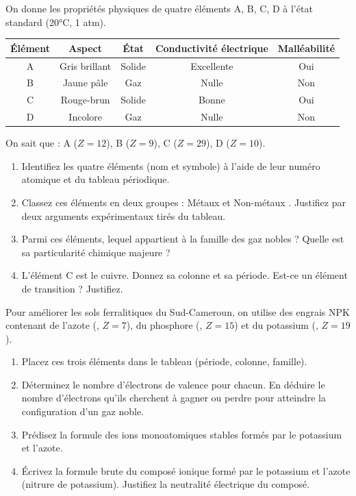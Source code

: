 \documentclass[11pt]{article}
\begin{document}
\begin{exercice}
On donne les propriétés physiques de quatre éléments A, B, C, D à l'état standard (20°C, 1 atm).

\begin{center}
\begin{tabular}{|c|c|c|c|c|}
\hline
\textbf{Élément} & \textbf{Aspect} & \textbf{État} & \textbf{Conductivité électrique} & \textbf{Malléabilité} \\ \hline
A & Gris brillant & Solide & Excellente & Oui \\ \hline
B & Jaune pâle & Gaz & Nulle & Non \\ \hline
C & Rouge-brun & Solide & Bonne & Oui \\ \hline
D & Incolore & Gaz & Nulle & Non \\ \hline
\end{tabular}
\end{center}
On sait que : A ($Z=12$), B ($Z=9$), C ($Z=29$), D ($Z=10$).
\begin{enumerate}
    \item Identifiez les quatre éléments (nom et symbole) à l'aide de leur numéro atomique et du tableau périodique.
    \item Classez ces éléments en deux groupes : \og Métaux \fg et \og Non-métaux \fg. Justifiez par deux arguments expérimentaux tirés du tableau.
    \item Parmi ces éléments, lequel appartient à la famille des gaz nobles ? Quelle est sa particularité chimique majeure ?
    \item L'élément C est le cuivre. Donnez sa colonne et sa période. Est-ce un élément de transition ? Justifiez.
\end{enumerate}
\end{exercice}

\begin{exercice}
Pour améliorer les sols ferralitiques du Sud-Cameroun, on utilise des engrais NPK contenant de l'azote (, $Z=7$), du phosphore (, $Z=15$) et du potassium (, $Z=19$).
\begin{enumerate}
    \item Placez ces trois éléments dans le tableau (période, colonne, famille).
    \item Déterminez le nombre d'électrons de valence pour chacun. En déduire le nombre d'électrons qu'ils cherchent à gagner ou perdre pour atteindre la configuration d'un gaz noble.
    \item Prédisez la formule des ions monoatomiques stables formés par le potassium et l'azote.
    \item Écrivez la formule brute du composé ionique formé par le potassium et l'azote (nitrure de potassium). Justifiez la neutralité électrique du composé.
\end{enumerate}
\end{exercice}
\end{document}
